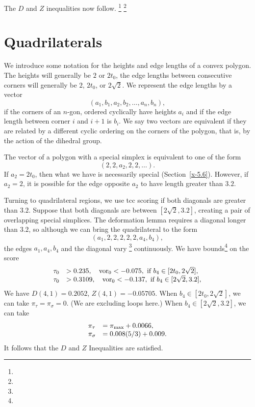 The $D$ and $Z$ inequalities now follow.%
\footnote{} %
\footnote{} %

\section{Quadrilaterals}

We introduce some notation for the heights and edge lengths of a convex
polygon.  The heights will generally be $2$ or $2t_0$, the edge lengths
between consecutive corners will generally be $2$, $2t_0$, or
$2\sqrt{2}$.  We represent the edge lengths by a vector
    $$(a_1,b_1,a_2,b_2,\ldots,a_n,b_n),$$
if the corners of an $n$-gon, ordered cyclically have heights $a_i$ and
if the edge length between corner $i$ and $i+1$ is $b_i$.  We say two
vectors are equivalent if they are related by a different cyclic
ordering on the corners of the polygon, that is, by the action of the
dihedral group.

The vector of a polygon with a special simplex is equivalent to one of
the form
    $$(2,2,a_2,2,2,\ldots).$$  If $a_2=2t_0$, then what we have is
necessarily special (Section~\ref{x-5.6}). However, if $a_2=2$, it is
possible for the edge opposite $a_2$ to have length greater than $3.2$.


Turning to quadrilateral regions, we use tcc scoring if both diagonals
are greater than $3.2$.   Suppose that both diagonals are between
$[2\sqrt{2},3.2]$, creating a pair of overlapping special simplices. The
deformation lemma requires a diagonal longer than $3.2$, so although we
can bring the quadrilateral to the form
    $$(a_1,2,2,2,2,2,a_4,b_4),$$
the edges $a_1,a_4,b_4$ and the diagonal vary%
\footnote{} %
continuously.
We have bounds\footnote{} %
 on the score
    $$
    \begin{array}{lll}
    \tau_0 &> 0.235, \quad \operatorname{vor}_0 < -0.075,
                \hbox{ if } b_4\in[2t_0,2\sqrt{2}],\\
    \tau_0 &> 0.3109, \quad \operatorname{vor}_0 < -0.137,
                \hbox{ if } b_4\in[2\sqrt{2},3.2],\\
    \end{array}
    $$
We have $D(4,1)=0.2052$, $Z(4,1)=-0.05705$. When
$b_4\in[2t_0,2\sqrt{2}]$, we can take $\pi_\tau=\pi_\sigma=0$. (We are
excluding loops here.) When $b_4\in[2\sqrt{2},3.2]$, we can take
    $$
    \begin{array}{lll}
    \pi_\tau &= \pi_{\max}+ 0.0066, \\
    \pi_\sigma &= 0.008 (5/3)+ 0.009. \\
    \end{array}
    $$
It follows that the $D$ and $Z$ Inequalities are satisfied.

